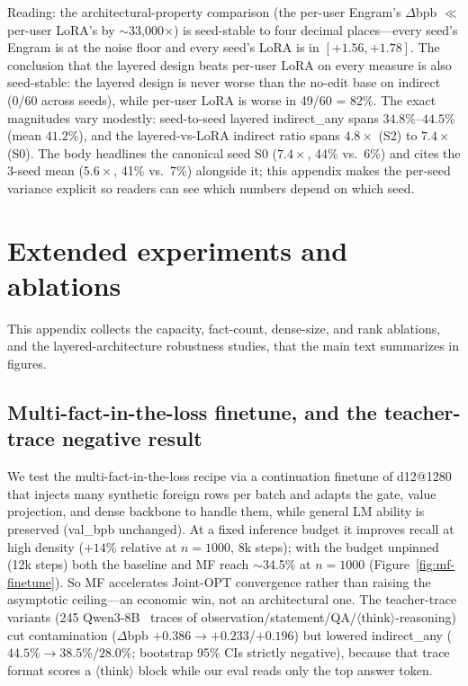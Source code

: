 \documentclass[letterpaper]{article} %
\begin{document}
Reading: the architectural-property comparison (the per-user
Engram's $\Delta$bpb $\ll$ per-user LoRA's by $\sim$33{,}000$\times$) is
seed-stable to four decimal places---every seed's Engram is at the
noise floor and every seed's LoRA is in $[+1.56, +1.78]$. The
conclusion that the layered design beats per-user LoRA on every
measure is also seed-stable: the layered design
is never worse than the no-edit base on indirect (0/60 across seeds),
while per-user LoRA is worse in 49/60 = 82\%. The exact magnitudes vary
modestly: seed-to-seed layered indirect\_any spans $34.8$\%--$44.5$\%
(mean $41.2$\%), and the layered-vs-LoRA indirect ratio spans $4.8\times$
(S2) to $7.4\times$ (S0). The body headlines the canonical seed
S0 ($7.4\times$, 44\% vs.\ 6\%) and cites the 3-seed mean
($5.6\times$, 41\% vs.\ 7\%) alongside it; this appendix makes the
per-seed variance explicit so readers can see which numbers depend
on which seed.

\section{Extended experiments and ablations}
\label{app:extended}

This appendix collects the capacity, fact-count, dense-size, and
rank ablations, and the layered-architecture robustness studies,
that the main text summarizes in figures.

\subsection{Multi-fact-in-the-loss finetune, and the teacher-trace negative result}
\label{sec:mf-finetune}
We test the multi-fact-in-the-loss recipe via a continuation
finetune of d12@1280 that injects many synthetic foreign rows per
batch and adapts the gate, value projection, and dense backbone to
handle them, while general LM ability is preserved (val\_bpb
unchanged). At a fixed inference budget it improves recall at high
density ($+14$\% relative at $n{=}1000$, 8k steps); with the budget
unpinned (12k steps) both the baseline and MF reach $\sim$34.5\% at
$n{=}1000$ (Figure~\ref{fig:mf-finetune}). So MF accelerates Joint-OPT
convergence rather than raising the asymptotic ceiling---an economic
win, not an architectural one. The teacher-trace variants
(245 Qwen3-8B~\citep{qwen2025qwen3} traces of
observation/statement/QA/$\langle$think$\rangle$-reasoning) cut
contamination ($\Delta$bpb $+0.386\to+0.233$/$+0.196$) but lowered
indirect\_any ($44.5\%\to38.5\%$/$28.0\%$; bootstrap 95\% CIs
strictly negative), because that trace format scores a
$\langle$think$\rangle$ block while our eval reads only the top
answer token.
\end{document}

